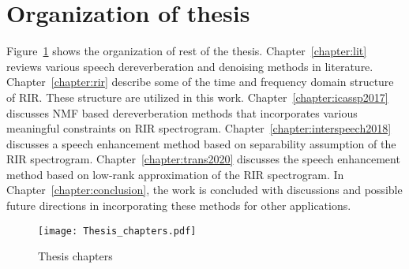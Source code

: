 \section{Organization of thesis}
Figure~\ref{fig:Thesis_chapters} shows the organization of rest of the thesis. Chapter~\ref{chapter:lit} reviews various speech dereverberation and denoising methods in literature. Chapter~\ref{chapter:rir} describe some of the time and frequency domain structure of RIR. These structure are utilized in this work. Chapter~\ref{chapter:icassp2017} discusses NMF based dereverberation methods that incorporates various meaningful constraints on RIR spectrogram. Chapter~\ref{chapter:interspeech2018} discusses a speech enhancement method based on separability assumption of the RIR spectrogram. Chapter~\ref{chapter:trans2020} discusses the speech enhancement method based on low-rank approximation of the RIR spectrogram. In Chapter~\ref{chapter:conclusion}, the work is concluded with discussions and possible future directions in incorporating these methods for other applications.
\begin{figure}
\centering
\texttt{[image: Thesis\_chapters.pdf]}
\caption{Thesis chapters}
\label{fig:Thesis_chapters}
\end{figure}
